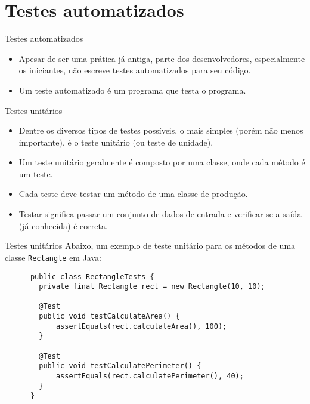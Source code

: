\documentclass[11pt]{beamer}
\begin{document}
  \section{Testes automatizados}

  \begin{frame}{Testes automatizados}
    \begin{itemize}
      \item Apesar de ser uma prática já antiga, parte dos desenvolvedores, especialmente os iniciantes, não escreve testes automatizados para seu código.
      \item Um teste automatizado é um programa que testa o programa.
    \end{itemize}
  \end{frame}
  
  \begin{frame}{Testes unitários}
    \begin{itemize}
      \item Dentre os diversos tipos de testes possíveis, o mais simples (porém não menos importante), é o teste unitário (ou teste de unidade).
      \item Um teste unitário geralmente é composto por uma classe, onde cada método é um teste.
      \item Cada teste deve testar um método de uma classe de produção.
      \item Testar significa passar um conjunto de dados de entrada e verificar se a saída (já conhecida) é correta.
    \end{itemize}
  \end{frame}

  \begin{frame}[fragile]{Testes unitários}
    Abaixo, um exemplo de teste unitário para os métodos de uma classe \verb|Rectangle| em Java:
    \begin{lstlisting}
      public class RectangleTests {
        private final Rectangle rect = new Rectangle(10, 10);

        @Test
        public void testCalculateArea() {
            assertEquals(rect.calculateArea(), 100);
        }

        @Test
        public void testCalculatePerimeter() {
            assertEquals(rect.calculatePerimeter(), 40);
        }
      }
    \end{lstlisting}
  \end{frame}
\end{document}
